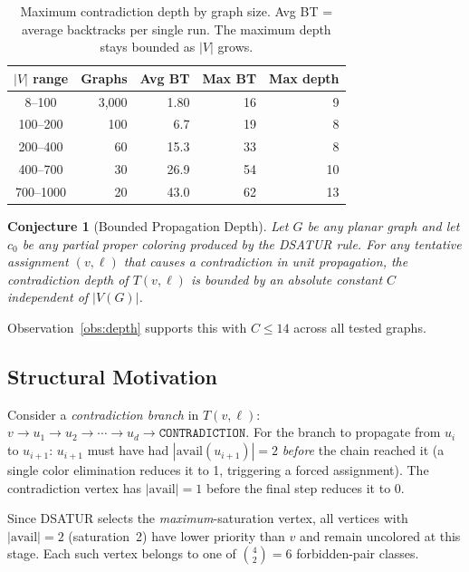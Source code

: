 \documentclass[11pt,twocolumn]{article}
\newtheorem{conjecture}{Conjecture}[section]
\begin{document}
\begin{table}[t]
\caption{Maximum contradiction depth by graph size.
Avg BT = average backtracks per single run.
The maximum depth stays bounded as $|V|$ grows.}
\label{tab:depth}
\centering\scriptsize
\begin{tabular}{crrrr}
\toprule
$|V|$ range & Graphs & Avg BT & Max BT & Max depth \\
\midrule
8--100    & 3{,}000 &  1.80 & 16 &  9 \\
100--200  &   100   &  6.7  & 19 &  8 \\
200--400  &    60   & 15.3  & 33 &  8 \\
400--700  &    30   & 26.9  & 54 & 10 \\
700--1000 &    20   & 43.0  & 62 & 13 \\
\bottomrule
\end{tabular}
\end{table}

\begin{conjecture}[Bounded Propagation Depth]
\label{conj:depth}
Let $G$ be any planar graph and let $c_0$ be any partial proper coloring
produced by the DSATUR rule.  For any tentative assignment $(v,\ell)$
that causes a contradiction in unit propagation, the contradiction depth
of $T(v,\ell)$ is bounded by an absolute constant $C$ independent of
$|V(G)|$.
\end{conjecture}

Observation~\ref{obs:depth} supports this with $C\leq 14$ across all
tested graphs.

\subsection{Structural Motivation}

Consider a \emph{contradiction branch} in $T(v,\ell)$:
$v\to u_1\to u_2\to\cdots\to u_d\to\mathtt{CONTRADICTION}$.
For the branch to propagate from $u_i$ to $u_{i+1}$:
$u_{i+1}$ must have had $|\mathrm{avail}(u_{i+1})|=2$ \emph{before}
the chain reached it (a single color elimination reduces it to 1,
triggering a forced assignment).  The contradiction vertex has
$|\mathrm{avail}|=1$ before the final step reduces it to 0.

Since DSATUR selects the \emph{maximum}-saturation vertex, all
vertices with $|\mathrm{avail}|=2$ (saturation~2) have lower priority
than $v$ and remain uncolored at this stage.  Each such vertex belongs
to one of $\binom{4}{2}=6$ forbidden-pair classes.
\end{document}
